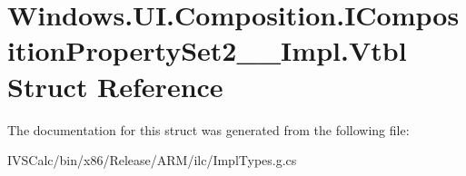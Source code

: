 \hypertarget{struct_windows_1_1_u_i_1_1_composition_1_1_i_composition_property_set2_____impl_1_1_vtbl}{}\section{Windows.\+U\+I.\+Composition.\+I\+Composition\+Property\+Set2\+\_\+\+\_\+\+Impl.\+Vtbl Struct Reference}
\label{struct_windows_1_1_u_i_1_1_composition_1_1_i_composition_property_set2_____impl_1_1_vtbl}


The documentation for this struct was generated from the following file\+:\begin{DoxyCompactItemize}
\item 
I\+V\+S\+Calc/bin/x86/\+Release/\+A\+R\+M/ilc/Impl\+Types.\+g.\+cs\end{DoxyCompactItemize}
